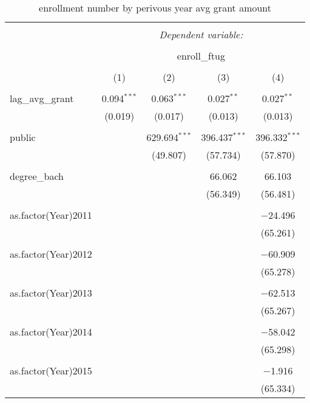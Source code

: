 
\begin{table}[H] \centering 
  \caption{enrollment number by perivous year avg grant amount} 
  \label{} 
\begin{tabular}{@{\extracolsep{5pt}}lcccc} 
\\[-1.8ex]\hline 
\hline \\[-1.8ex] 
 & \multicolumn{4}{c}{\textit{Dependent variable:}} \\ 
\cline{2-5} 
\\[-1.8ex] & \multicolumn{4}{c}{enroll\_ftug} \\ 
\\[-1.8ex] & (1) & (2) & (3) & (4)\\ 
\hline \\[-1.8ex] 
 lag\_avg\_grant & 0.094$^{***}$ & 0.063$^{***}$ & 0.027$^{**}$ & 0.027$^{**}$ \\ 
  & (0.019) & (0.017) & (0.013) & (0.013) \\ 
  & & & & \\ 
 public &  & 629.694$^{***}$ & 396.437$^{***}$ & 396.332$^{***}$ \\ 
  &  & (49.807) & (57.734) & (57.870) \\ 
  & & & & \\ 
 degree\_bach &  &  & 66.062 & 66.103 \\ 
  &  &  & (56.349) & (56.481) \\ 
  & & & & \\ 
 as.factor(Year)2011 &  &  &  & $-$24.496 \\ 
  &  &  &  & (65.261) \\ 
  & & & & \\ 
 as.factor(Year)2012 &  &  &  & $-$60.909 \\ 
  &  &  &  & (65.278) \\ 
  & & & & \\ 
 as.factor(Year)2013 &  &  &  & $-$62.513 \\ 
  &  &  &  & (65.267) \\ 
  & & & & \\ 
 as.factor(Year)2014 &  &  &  & $-$58.042 \\ 
  &  &  &  & (65.298) \\ 
  & & & & \\ 
 as.factor(Year)2015 &  &  &  & $-$1.916 \\ 
  &  &  &  & (65.334) \\ 

\end{tabular}
\end{table}
